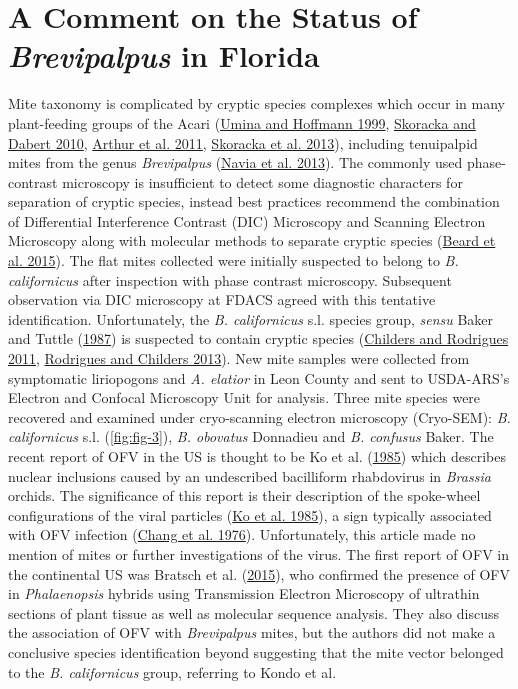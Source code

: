 \documentclass{ufdissertation}[overrideChapters] %
\begin{document}
{{\section{\texorpdfstring{A Comment on the Status of \emph{Brevipalpus} in Florida}{A Comment on the Status of Brevipalpus in Florida}}\label{a-comment-on-the-status-of-brevipalpus-in-florida}}

Mite taxonomy is complicated by cryptic species complexes which occur in many plant-feeding groups of the Acari (\protect\hyperlink{ref-Umina1999}{Umina and Hoffmann 1999}, \protect\hyperlink{ref-Skoracka2010}{Skoracka and Dabert 2010}, \protect\hyperlink{ref-Arthur2011}{Arthur et al. 2011}, \protect\hyperlink{ref-Skoracka2013}{Skoracka et al. 2013}), including tenuipalpid mites from the genus \emph{Brevipalpus} (\protect\hyperlink{ref-Navia2013}{Navia et al. 2013}). The commonly used phase-contrast microscopy is insufficient to detect some diagnostic characters for separation of cryptic species, instead best practices recommend the combination of Differential Interference Contrast (DIC) Microscopy and Scanning Electron Microscopy along with molecular methods to separate cryptic species (\protect\hyperlink{ref-Beard2015}{Beard et al. 2015}). The flat mites collected were initially suspected to belong to \emph{B. californicus} after inspection with phase contrast microscopy. Subsequent observation via DIC microscopy at FDACS agreed with this tentative identification. Unfortunately, the \emph{B. californicus} s.l. species group, \emph{sensu} Baker and Tuttle (\protect\hyperlink{ref-Baker1987}{1987}) is suspected to contain cryptic species (\protect\hyperlink{ref-Childers2011}{Childers and Rodrigues 2011}, \protect\hyperlink{ref-Rodrigues2013}{Rodrigues and Childers 2013}). New mite samples were collected from symptomatic liriopogons and \emph{A. elatior} in Leon County and sent to USDA-ARS's Electron and Confocal Microscopy Unit for analysis. Three mite species were recovered and examined under cryo-scanning electron microscopy (Cryo-SEM): \emph{B. californicus} s.l. (\ref{fig:fig-3}), \emph{B. obovatus} Donnadieu and \emph{B. confusus} Baker. The recent report of OFV in the US is thought to be Ko et al. (\protect\hyperlink{ref-Ko1985}{1985}) which describes nuclear inclusions caused by an undescribed bacilliform rhabdovirus in \emph{Brassia} orchids. The significance of this report is their description of the spoke-wheel configurations of the viral particles (\protect\hyperlink{ref-Ko1985}{Ko et al. 1985}), a sign typically associated with OFV infection (\protect\hyperlink{ref-Chang1976}{Chang et al. 1976}). Unfortunately, this article made no mention of mites or further investigations of the virus. The first report of OFV in the continental US was Bratsch et al. (\protect\hyperlink{ref-Bratsch2015}{2015}), who confirmed the presence of OFV in \emph{Phalaenopsis} hybrids using Transmission Electron Microscopy of ultrathin sections of plant tissue as well as molecular sequence analysis. They also discuss the association of OFV with \emph{Brevipalpus} mites, but the authors did not make a conclusive species identification beyond suggesting that the mite vector belonged to the \emph{B. californicus} group, referring to Kondo et al. }
\end{document}
